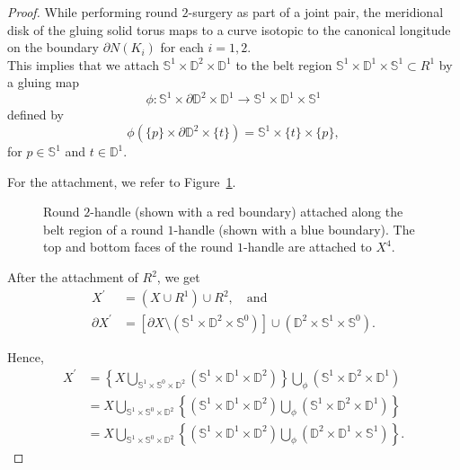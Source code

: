 \documentclass[10pt,a4paper]{amsart}
\newcommand{\D}{\mathbb{D}}
\newcommand{\s}{\mathbb{S}}
\begin{document}
\begin{proof}
While performing round $2$-surgery as part of a joint pair, the meridional disk of the gluing solid torus maps to a curve isotopic to the canonical longitude on the boundary $\partial N(K_{i})$ for each $i=1,2$.\\
This implies that we attach $\s^{1} \times \D^{2} \times \D^{1}$ to the belt region $\s^{1} \times \D^{1} \times \s^{1} \subset R^{1}$ by a gluing map 
\[
\phi: \s^{1} \times \partial \D^{2} \times \D^{1} \longrightarrow \s^{1} \times \D^{1} \times \s^{1}
\]
defined by
\[
\phi\left(\{p\} \times \partial \D^{2} \times \{t\}\right) = \s^{1} \times \{t\} \times \{p\},
\]
for $p \in \s^{1}$ and $t \in \D^{1}$. 

For the attachment, we refer to Figure~\ref{fig:round2handle}.

\begin{figure}[ht]
\begin{center}

\caption{Round $2$-handle (shown with a red boundary) attached along the belt region of a round $1$-handle (shown with a blue boundary). 
The top and bottom faces of the round $1$-handle are attached to $X^{4}$.}
\label{fig:round2handle}
\end{center}
\end{figure}

After the attachment of $R^{2}$, we get
\[
\begin{aligned}
X^{\prime} &= (X \cup R^{1}) \cup R^{2}, \quad \text{and} \\
\partial X^{\prime} &= \left[\partial X \setminus \left(\s^{1} \times \D^{2} \times \s^{0}\right)\right] 
\cup \left(\D^{2} \times \s^{1} \times \s^{0}\right).
\end{aligned}
\]

Hence,
\[
\begin{aligned}
X^{\prime} 
&= \left\{ X \bigcup_{\s^{1} \times \s^{0} \times \D^{2}} \left(\s^{1} \times \D^{1} \times \D^{2}\right) \right\} 
\bigcup_{\phi} \left(\s^{1} \times \D^{2} \times \D^{1}\right) \\
&= X \bigcup_{\s^{1} \times \s^{0} \times \D^{2}} 
\left\{ \left(\s^{1} \times \D^{1} \times \D^{2}\right) \bigcup_{\phi} \left(\s^{1} \times \D^{2} \times \D^{1}\right) \right\} \\
&= X \bigcup_{\s^{1} \times \s^{0} \times \D^{2}} 
\left\{ \left(\s^{1} \times \D^{1} \times \D^{2}\right) \bigcup_{\phi} \left(\D^{2} \times \D^{1} \times \s^{1}\right) \right\}.
\end{aligned}
\]


\end{proof}
\end{document}

